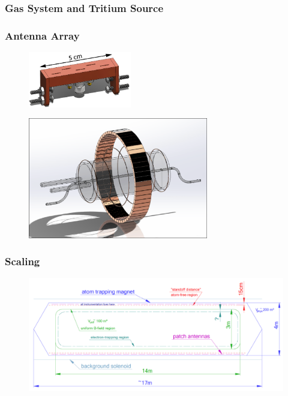 \subsubsection*{Gas System and Tritium Source}
\subsubsection*{Antenna Array}

\begin{figure}[htbp]
    \centering
    \includegraphics*[width=0.4\textwidth]{figs/Chapter-3/230614_5slot_model.png}
    \caption{}
\end{figure}

\begin{figure}[htbp]
    \centering
    \includegraphics*[width=0.7\textwidth]{figs/Chapter-3/230614_fscd_render.png}
    \caption{}
\end{figure}

\subsubsection*{Scaling}

\begin{figure}[htbp]
    \centering
    \includegraphics*[width=1\textwidth]{figs/Chapter-3/230614_large_scale_antenna.png}
    \caption{}
\end{figure}


